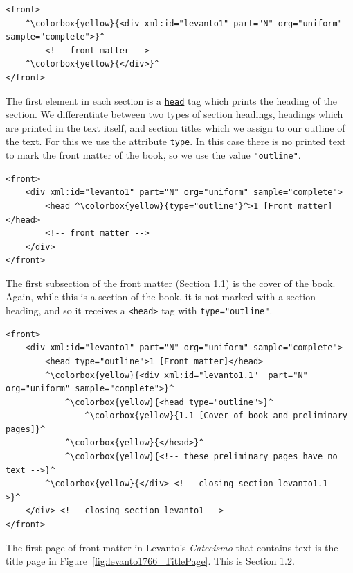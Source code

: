 \documentclass[12pt,a4paper]{article}
\begin{document}
\begin{lstlisting}[showtabs=true]
<front>
	^\colorbox{yellow}{<div xml:id="levanto1" part="N" org="uniform" sample="complete">}^
		<!-- front matter -->
	^\colorbox{yellow}{</div>}^
</front>
\end{lstlisting}

The first element in each section is a \hyperref[tag-sec:head]{\texttt{head}} tag which prints the heading of the section.  We differentiate between two types of section headings, headings which are printed in the text itself, and section titles which we assign to our outline of the text.  For this we use the attribute \hyperref[att-sec:part]{\texttt{type}}.  In this case there is no printed text to mark the front matter of the book, so we use the value \texttt{"outline"}.

\begin{lstlisting}
<front>
	<div xml:id="levanto1" part="N" org="uniform" sample="complete"> 
		<head ^\colorbox{yellow}{type="outline"}^>1 [Front matter]</head>
		<!-- front matter -->
	</div>
</front>
\end{lstlisting}

The first subsection of the front matter (Section 1.1) is the cover of the book.  Again, while this is a section of the book, it is not marked with a section heading, and so it receives a \texttt{<head>} tag with \texttt{type="outline"}.

\begin{lstlisting}
<front>
	<div xml:id="levanto1" part="N" org="uniform" sample="complete"> 
		<head type="outline">1 [Front matter]</head>
		^\colorbox{yellow}{<div xml:id="levanto1.1"  part="N" org="uniform" sample="complete">}^
			^\colorbox{yellow}{<head type="outline">}^
				^\colorbox{yellow}{1.1 [Cover of book and preliminary pages]}^
			^\colorbox{yellow}{</head>}^
			^\colorbox{yellow}{<!-- these preliminary pages have no text -->}^
		^\colorbox{yellow}{</div> <!-- closing section levanto1.1 -->}^
	</div> <!-- closing section levanto1 -->
</front>
\end{lstlisting}

The first page of front matter in Levanto's \emph{Catecismo} that contains text is the title page in Figure~\ref{fig:levanto1766_TitlePage}.  This is Section 1.2.
\end{document}
